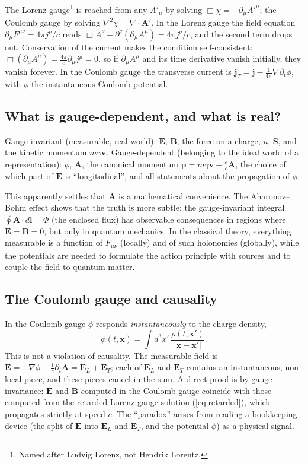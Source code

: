 \documentclass[11pt,a4paper]{book}
\begin{document}
The Lorenz gauge\footnote{Named after Ludvig Lorenz, not Hendrik Lorentz.} is reached from any $A'_\mu$
by solving $\Box\chi=-\partial_\mu A'^\mu$; the Coulomb gauge by solving $\nabla^2\chi=\nabla\cdot\mathbf A'$.
In the Lorenz gauge the field equation $\partial_\mu F^{\mu\nu}=4\pi j^\nu/c$ reads
$\Box A^\nu-\partial^\nu(\partial_\mu A^\mu)=4\pi j^\nu/c$, and the second term drops out.
Conservation of the current makes the condition self-consistent: $\Box(\partial_\mu A^\mu)=\frac{4\pi}c\partial_\mu j^\mu=0$,
so if $\partial_\mu A^\mu$ and its time derivative vanish initially, they vanish forever.
In the Coulomb gauge the transverse current is
$\mathbf j_T=\mathbf j-\frac1{4\pi}\nabla\partial_t\phi$, with $\phi$ the instantaneous Coulomb potential.

\subsection{What is gauge-dependent, and what is real?}

Gauge-invariant (measurable, real-world): $\mathbf E$, $\mathbf B$, the force on a charge, $u$, $\mathbf S$,
and the kinetic momentum $m\gamma\mathbf v$. Gauge-dependent (belonging to the ideal world of a
representation): $\phi$, $\mathbf A$, the canonical momentum $\mathbf p=m\gamma\mathbf v+\frac ec\mathbf A$,
the choice of which part of $\mathbf E$ is ``longitudinal'', and all statements about the
propagation of $\phi$.

This apparently settles that $\mathbf A$ is a mathematical convenience. The Aharonov--Bohm effect
shows that the truth is more subtle: the gauge-invariant integral $\oint\mathbf A\cdot d\mathbf l=\Phi$
(the enclosed flux) has observable consequences in regions where $\mathbf E=\mathbf B=0$, but only in
quantum mechanics. In the classical theory, everything measurable is a function of $F_{\mu\nu}$
(locally) and of such holonomies (globally), while the potentials are needed to formulate the action
principle with sources and to couple the field to quantum matter.

\subsection{The Coulomb gauge and causality}

In the Coulomb gauge $\phi$ responds \emph{instantaneously} to the charge density,
\begin{equation}
\phi(t,\mathbf x)=\int d^3x'\,\frac{\rho(t,\mathbf x')}{|\mathbf x-\mathbf x'|}.
\end{equation}
This is not a violation of causality. The measurable field is $\mathbf E=-\nabla\phi-\frac1c\partial_t\mathbf A=\mathbf E_L+\mathbf E_T$;
each of $\mathbf E_L$ and $\mathbf E_T$ contains an instantaneous, non-local piece, and
these pieces cancel in the sum. A direct proof is by gauge invariance: $\mathbf E$ and $\mathbf B$
computed in the Coulomb gauge coincide with those computed from the retarded Lorenz-gauge solution
(\ref{eq:retarded}), which propagates strictly at speed $c$. The ``paradox'' arises from reading a
bookkeeping device (the split of $\mathbf E$ into $\mathbf E_L$ and $\mathbf E_T$, and the
potential $\phi$) as a physical signal.
\end{document}
